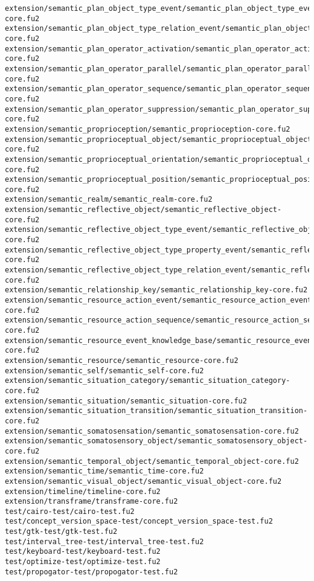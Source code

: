 \begin{lstlisting}
extension/semantic_plan_object_type_event/semantic_plan_object_type_event-core.fu2
extension/semantic_plan_object_type_relation_event/semantic_plan_object_type_relation_event-core.fu2
extension/semantic_plan_operator_activation/semantic_plan_operator_activation-core.fu2
extension/semantic_plan_operator_parallel/semantic_plan_operator_parallel-core.fu2
extension/semantic_plan_operator_sequence/semantic_plan_operator_sequence-core.fu2
extension/semantic_plan_operator_suppression/semantic_plan_operator_suppression-core.fu2
extension/semantic_proprioception/semantic_proprioception-core.fu2
extension/semantic_proprioceptual_object/semantic_proprioceptual_object-core.fu2
extension/semantic_proprioceptual_orientation/semantic_proprioceptual_orientation-core.fu2
extension/semantic_proprioceptual_position/semantic_proprioceptual_position-core.fu2
extension/semantic_realm/semantic_realm-core.fu2
extension/semantic_reflective_object/semantic_reflective_object-core.fu2
extension/semantic_reflective_object_type_event/semantic_reflective_object_type_event-core.fu2
extension/semantic_reflective_object_type_property_event/semantic_reflective_object_type_property_event-core.fu2
extension/semantic_reflective_object_type_relation_event/semantic_reflective_object_type_relation_event-core.fu2
extension/semantic_relationship_key/semantic_relationship_key-core.fu2
extension/semantic_resource_action_event/semantic_resource_action_event-core.fu2
extension/semantic_resource_action_sequence/semantic_resource_action_sequence-core.fu2
extension/semantic_resource_event_knowledge_base/semantic_resource_event_knowledge_base-core.fu2
extension/semantic_resource/semantic_resource-core.fu2
extension/semantic_self/semantic_self-core.fu2
extension/semantic_situation_category/semantic_situation_category-core.fu2
extension/semantic_situation/semantic_situation-core.fu2
extension/semantic_situation_transition/semantic_situation_transition-core.fu2
extension/semantic_somatosensation/semantic_somatosensation-core.fu2
extension/semantic_somatosensory_object/semantic_somatosensory_object-core.fu2
extension/semantic_temporal_object/semantic_temporal_object-core.fu2
extension/semantic_time/semantic_time-core.fu2
extension/semantic_visual_object/semantic_visual_object-core.fu2
extension/timeline/timeline-core.fu2
extension/transframe/transframe-core.fu2
test/cairo-test/cairo-test.fu2
test/concept_version_space-test/concept_version_space-test.fu2
test/gtk-test/gtk-test.fu2
test/interval_tree-test/interval_tree-test.fu2
test/keyboard-test/keyboard-test.fu2
test/optimize-test/optimize-test.fu2
test/propogator-test/propogator-test.fu2

\end{lstlisting}
